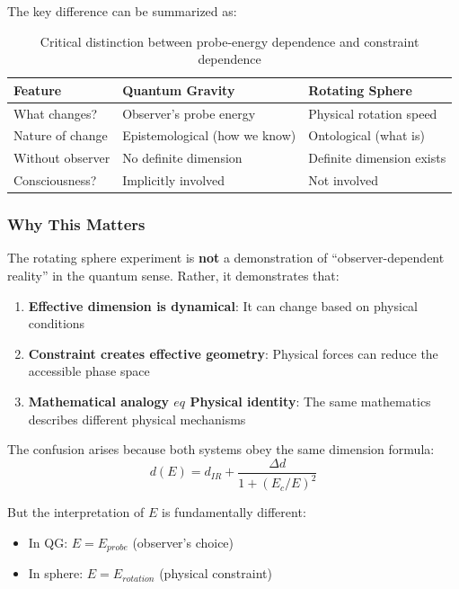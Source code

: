\documentclass[12pt,a4paper]{article}
\begin{document}
The key difference can be summarized as:

\begin{table}[h]
\centering
\begin{tabular}{p{3cm}p{5cm}p{5cm}}
\toprule
\textbf{Feature} & \textbf{Quantum Gravity} & \textbf{Rotating Sphere} \\
\midrule
What changes? & Observer's probe energy & Physical rotation speed \\
Nature of change & Epistemological (how we know) & Ontological (what is) \\
Without observer & No definite dimension & Definite dimension exists \\
Consciousness? & Implicitly involved & Not involved \\
\bottomrule
\end{tabular}
\caption{Critical distinction between probe-energy dependence and constraint dependence}
\end{table}

\subsubsection{Why This Matters}

The rotating sphere experiment is \textbf{not} a demonstration of ``observer-dependent reality'' in the quantum sense. Rather, it demonstrates that:

\begin{enumerate}
    \item \textbf{Effective dimension is dynamical}: It can change based on physical conditions
    \item \textbf{Constraint creates effective geometry}: Physical forces can reduce the accessible phase space
    \item \textbf{Mathematical analogy $
eq$ Physical identity}: The same mathematics describes different physical mechanisms
\end{enumerate}

The confusion arises because both systems obey the same dimension formula:
\begin{equation}
    d(E) = d_{IR} + \frac{\Delta d}{1+(E_c/E)^2}
\end{equation}

But the interpretation of $E$ is fundamentally different:
\begin{itemize}
    \item In QG: $E = E_{probe}$ (observer's choice)
    \item In sphere: $E = E_{rotation}$ (physical constraint)
\end{itemize}
\end{document}
